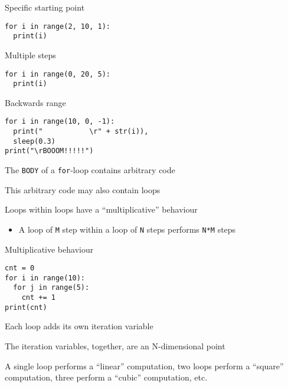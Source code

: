 \documentclass{beamer}
\begin{document}
\begin{frame}[fragile]{Specific starting point}
\begin{lstlisting}
for i in range(2, 10, 1):
  print(i)
\end{lstlisting}
\end{frame}

\begin{frame}[fragile]{Multiple steps}
\begin{lstlisting}
for i in range(0, 20, 5):
  print(i)
\end{lstlisting}
\end{frame}

\begin{frame}[fragile]{Backwards range}
\begin{lstlisting}
for i in range(10, 0, -1):
  print("           \r" + str(i)),
  sleep(0.3)
print("\rBOOOM!!!!!")
\end{lstlisting}
\end{frame}

\begin{slide}{
\item The \texttt{BODY} of a \texttt{for}-loop contains arbitrary code
\item This arbitrary code may also contain loops
\item Loops within loops have a ``multiplicative'' behaviour
\begin{itemize}
\item A loop of \texttt{M} step within a loop of \texttt{N} steps performs \texttt{N*M} steps
\end{itemize}
}\end{slide}

\begin{frame}[fragile]{Multiplicative behaviour}
\begin{lstlisting}
cnt = 0
for i in range(10):
  for j in range(5):
    cnt += 1
print(cnt)
\end{lstlisting}
\end{frame}

\begin{slide}{
\item Each loop adds its own iteration variable
\item The iteration variables, together, are an N-dimensional point
\item A single loop performs a ``linear'' computation, two loops perform a ``square''     computation, three perform a ``cubic'' computation, etc.
}\end{slide}
\end{document}
